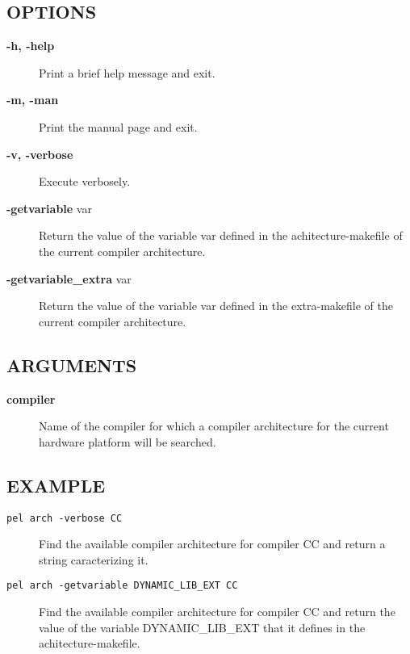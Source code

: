 \documentclass{article}
\begin{document}
\subsection*{OPTIONS\label{arch_OPTIONS}}
\begin{description}

\item[\textbf{-h, -help}] \mbox{}

Print a brief help message and exit.


\item[\textbf{-m, -man}] \mbox{}

Print the manual page and exit.


\item[\textbf{-v, -verbose}] \mbox{}

Execute verbosely.


\item[\textbf{-getvariable} var] \mbox{}

Return the value of the variable var
defined in the achitecture-makefile of the current
compiler architecture.


\item[\textbf{-getvariable\_extra} var] \mbox{}

Return the value of the variable var
defined in the extra-makefile of the current
compiler architecture.

\end{description}
\subsection*{ARGUMENTS\label{arch_ARGUMENTS}}
\begin{description}

\item[\textbf{compiler}] \mbox{}

Name of the compiler for which a compiler architecture
for the current hardware platform
will be searched.

\end{description}
\subsection*{EXAMPLE\label{arch_EXAMPLE}}
\begin{description}

\item[\texttt{pel arch -verbose CC}] \mbox{}

Find the available compiler architecture for compiler CC
and return a string caracterizing it.


\item[\texttt{pel arch -getvariable DYNAMIC\_LIB\_EXT CC}] \mbox{}

Find the available compiler architecture for compiler CC
and return the value of the variable DYNAMIC\_LIB\_EXT that it defines
in the achitecture-makefile.

\end{description}
\end{document}
